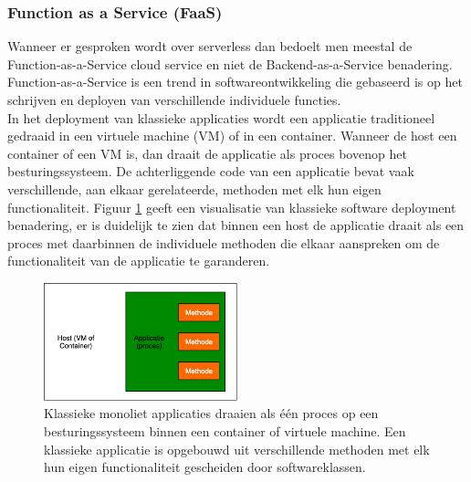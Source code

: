 \subsubsection{Function as a Service (FaaS)}
Wanneer er gesproken wordt over serverless dan bedoelt men meestal de Function-as-a-Service cloud service en niet de Backend-as-a-Service benadering.  Function-as-a-Service is een trend in softwareontwikkeling die gebaseerd is op het schrijven en deployen van verschillende individuele functies.
\\
In het deployment van klassieke applicaties wordt een applicatie traditioneel gedraaid in een virtuele machine (VM) of in een container. Wanneer de host een container of een VM is, dan draait de applicatie als proces bovenop het besturingssysteem. De achterliggende code van een applicatie bevat vaak verschillende, aan elkaar gerelateerde, methoden met elk hun eigen functionaliteit. Figuur \ref{fig:traditional-software-deployment} geeft een visualisatie van klassieke software deployment benadering, er is duidelijk te zien dat binnen een host de applicatie draait als een proces met daarbinnen de individuele methoden die elkaar aanspreken om de functionaliteit van de applicatie te garanderen.
\begin{figure}
    \centering
    \includegraphics[width=0.5\textwidth]{img/traditional_software_deployment.png}
    \caption{Klassieke monoliet applicaties draaien als één proces op een besturingssysteem binnen een container of virtuele machine. Een klassieke applicatie is opgebouwd uit verschillende methoden met elk hun eigen functionaliteit gescheiden door softwareklassen.} 
    \label{fig:traditional-software-deployment}  
\end{figure}
\\
